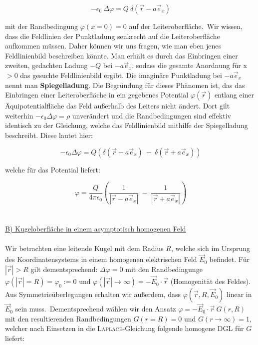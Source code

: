 \begin{equation*}
-\epsilon_0 \ \Delta\varphi = Q \ \delta(\vec{r}-a\vec{e}_x)
\end{equation*}

mit der Randbedingung $\varphi(x=0) = 0$ auf der Leiteroberfläche.\
Wir wissen, dass die Feldlinien der Punktladung senkrecht auf die Leiteroberfläche aufkommen müssen. Daher können wir uns fragen, wie man eben jenes Feldlinienbild beschreiben könnte. Man erhält es durch das Einbringen einer zweiten, gedachten Ladung $-Q$ bei $-a\vec{e}_x$, sodass die gesamte Anordnung für x$>0$ das gesuchte Feldlinienbild ergibt. Die imaginäre Punktladung bei $-a\vec{e}_x$ nennt man \textbf{Spiegelladung}. Die Begründung für dieses Phänomen ist, das das Einbringen einer Leiteroberfläche in ein gegebenes Potential $\varphi (\vec{r})$ entlang einer Äquipotentialfläche das Feld außerhalb des Leiters nicht ändert. Dort gilt weiterhin $-\epsilon_0 \Delta\varphi = \rho$ unverändert und die Randbedingungen sind effektiv identisch zu der Gleichung, welche das Feldlinienbild mithilfe der Spiegelladung beschreibt. Diese lautet hier:

\begin{equation*}
- \epsilon_0\Delta\varphi = Q \left(\delta(\vec{r}-a\vec{e}_x) \ - \ \delta(\vec{r}+a\vec{e}_x)\right)
\end{equation*}

welche für das Potential liefert:

\begin{equation*}
\varphi = \frac{Q}{4\pi\epsilon_0} \left(\frac{1}{|\vec{r}-a\vec{e}_x|} \ - \ \frac{1}{|\vec{r}+a\vec{e}_x|}\right)
\end{equation*}
\ \\
\ \\

\underline{B) Kugeloberfläche in einem asymptotisch homogenen Feld}\
\\
\ \\
Wir betrachten eine leitende Kugel mit dem Radius $R$, welche sich im Ursprung des Koordinatensystems in einem homogenen elektrischen Feld $\vec{E}_0$ befindet. Für $|\vec{r}|>R$ gilt dementsprechend: $\Delta\varphi = 0$ mit den Randbedingunge $\varphi(|\vec{r}| = R) = \varphi_0 := 0$ und $\varphi(|\vec{r}|\rightarrow\infty) = -\vec{E}_0\cdot\vec{r}$ (Homogenität des Feldes). Aus Symmetrieüberlegungen erhalten wir außerdem, dass $\varphi(\vec{r},R,\vec{E}_0)$ linear in $\vec{E}_0$ sein muss.\
Dementsprechend wählen wir den Ansatz $\varphi = -\vec{E}_0 \cdot\vec{r} \ G(r,R)$ mit den resultierenden Randbedingungen $G(r=R)=0$ und $G(r\rightarrow\infty
) =1$, welcher nach Einsetzen in die \textsc{Laplace}-Gleichung folgende homogene DGL für $G$ liefert:

